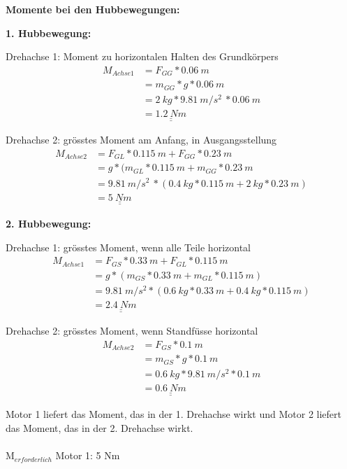 \newpage

\textbf{Momente bei den Hubbewegungen:}

\textbf{1. Hubbewegung:}

Drehachse 1: Moment zu horizontalen Halten des Grundkörpers
\begin{align*}
    M_{Achse 1} &= F_{GG} * 0.06\ m \\
    &= m_{GG} * g * 0.06\ m \\
    &= 2\ kg * 9.81\ m/s^2\ * 0.06\ m \\
    &= \underline{\underline{1.2\ Nm}}
\end{align*}

Drehachse 2: grösstes Moment am Anfang, in Ausgangsstellung
\begin{align*}
    M_{Achse 2} &= F_{GL} * 0.115\ m + F_{GG} * 0.23\ m \\
    &= g * (m_{GL} * 0.115\ m + m_{GG} * 0.23\ m \\
    &= 9.81\ m/s^2\ * (0.4\ kg * 0.115\ m + 2\ kg * 0.23\ m) \\
    &= \underline{\underline{5\ Nm}}
\end{align*}

\textbf{2. Hubbewegung:}

Drehachse 1: grösstes Moment, wenn alle Teile horizontal
\begin{align*}
    M_{Achse 1} &= F_{GS} * 0.33\ m + F_{GL} * 0.115\ m \\
    &= g * (m_{GS} * 0.33\ m + m_{GL} * 0.115\ m) \\
    &= 9.81\ m/s^2 * (0.6\ kg * 0.33\ m + 0.4\ kg * 0.115\ m) \\
    &= \underline{\underline{2.4\ Nm}}
\end{align*}

Drehachse 2: grösstes Moment, wenn Standfüsse horizontal
\begin{align*}
    M_{Achse 2} &= F_{GS} * 0.1\ m \\
    &= m_{GS} * g * 0.1\ m \\
    &= 0.6\ kg * 9.81\ m/s^2 * 0.1\ m \\
    &=\underline{\underline{0.6\ Nm}}
\end{align*}

Motor 1 liefert das Moment, das in der 1. Drehachse wirkt und Motor 2 liefert das Moment, das in der 2. Drehachse wirkt.\\
\\
M$_{erforderlich}$ Motor 1: 5 Nm\\

